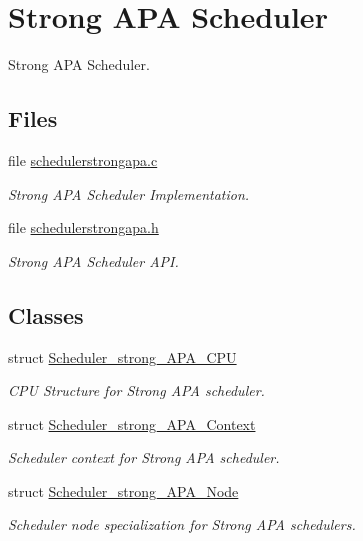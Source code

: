 \hypertarget{group__RTEMSScoreSchedulerStrongAPA}{}\section{Strong A\+PA Scheduler}
\label{group__RTEMSScoreSchedulerStrongAPA}


Strong A\+PA Scheduler.  


\subsection*{Files}
\begin{DoxyCompactItemize}
\item 
file \hyperlink{schedulerstrongapa_8c}{schedulerstrongapa.\+c}
\begin{DoxyCompactList}\small\item\em Strong A\+PA Scheduler Implementation. \end{DoxyCompactList}\item 
file \hyperlink{schedulerstrongapa_8h}{schedulerstrongapa.\+h}
\begin{DoxyCompactList}\small\item\em Strong A\+PA Scheduler A\+PI. \end{DoxyCompactList}\end{DoxyCompactItemize}
\subsection*{Classes}
\begin{DoxyCompactItemize}
\item 
struct \hyperlink{structScheduler__strong__APA__CPU}{Scheduler\+\_\+strong\+\_\+\+A\+P\+A\+\_\+\+C\+PU}
\begin{DoxyCompactList}\small\item\em C\+PU Structure for Strong A\+PA scheduler. \end{DoxyCompactList}\item 
struct \hyperlink{structScheduler__strong__APA__Context}{Scheduler\+\_\+strong\+\_\+\+A\+P\+A\+\_\+\+Context}
\begin{DoxyCompactList}\small\item\em Scheduler context for Strong A\+PA scheduler. \end{DoxyCompactList}\item 
struct \hyperlink{structScheduler__strong__APA__Node}{Scheduler\+\_\+strong\+\_\+\+A\+P\+A\+\_\+\+Node}
\begin{DoxyCompactList}\small\item\em Scheduler node specialization for Strong A\+PA schedulers. \end{DoxyCompactList}\end{DoxyCompactItemize}
